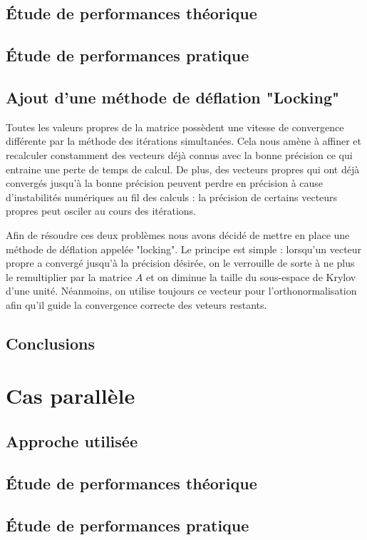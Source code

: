 \documentclass[11pt,a4paper]{article}
\begin{document}
	\subsection{Étude de performances théorique}
	\subsection{Étude de performances pratique}
	\subsection{Ajout d'une méthode de déflation "Locking"}
		Toutes les valeurs propres de la matrice possèdent une vitesse de convergence différente par la méthode des itérations simultanées. Cela nous amène à affiner et recalculer constamment des vecteurs déjà connus avec la bonne précision ce qui entraine une perte de temps de calcul. De plus, des vecteurs propres qui ont déjà convergés jusqu'à la bonne précision peuvent perdre en précision à cause d'instabilités numériques au fil des calculs : la précision de certains vecteurs propres peut osciler au cours des itérations.

		Afin de résoudre ces deux problèmes nous avons décidé de mettre en place une méthode de déflation appelée "locking". Le principe est simple : lorsqu'un vecteur propre a convergé jusqu'à la précision désirée, on le verrouille de sorte à ne plus le remultiplier par la matrice $A$ et on diminue la taille du sous-espace de Krylov d'une unité. Néanmoins, on utilise toujours ce vecteur pour l'orthonormalisation afin qu'il guide la convergence correcte des veteurs restants.

	\subsection{Conclusions}

\section{Cas parallèle}
	
	\subsection{Approche utilisée}
	\subsection{Étude de performances théorique}
	\subsection{Étude de performances pratique}
\end{document}
